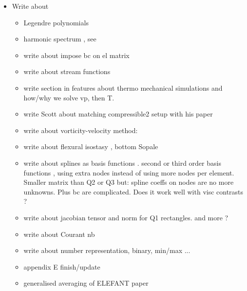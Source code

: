 \begin{itemize}
\item Write about


  \begin{itemize}
  \item Legendre polynomials
  \item harmonic spectrum , see \cite{ribr99}
  \item write about impose bc on el matrix
  \item write about stream functions 
  \item write section in features about thermo mechanical simulations and how/why we solve vp, then T.
  \item write Scott about matching compressible2 setup with his paper
  \item write about vorticity-velocity method: \cite{gats91,gust93,dehu95,ergq99,amct04,spez87}
  \item write about flexural isostasy \cite{maie12}, bottom Sopale
  \item write about splines as basis functions \cite{chri92}. second or third order basis functions , using extra nodes instead of using more nodes per element. 
  Smaller matrix than Q2 or Q3 but: spline coeffs on nodes are no more unknowns. Plus bc are complicated. Does it work well with visc contrasts ?
  \item write about jacobian tensor and norm for Q1 rectangles. and more ?
  \item write about Courant nb
  \item write about number representation, binary, min/max ... 
  \item appendix E finish/update
  \item generalised averaging of ELEFANT paper
  \it
  \end{itemize}
\end{itemize}

